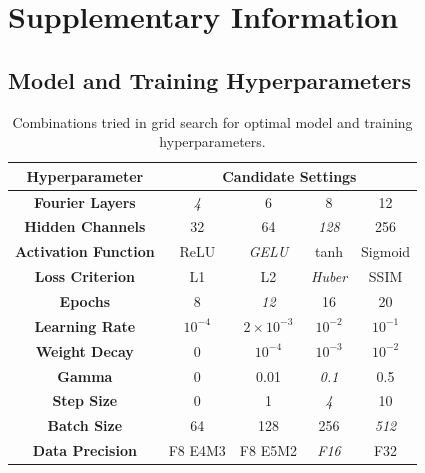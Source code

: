 \documentclass[preprint,review,12pt,numafflabel]{elsarticle}
\begin{document}

% 


\clearpage
\appendix

\renewcommand{\thesection}{S\arabic{section}}
\renewcommand{\thesubsection}{S\arabic{section}.\arabic{subsection}}
\renewcommand{\thefigure}{S\arabic{figure}}
\renewcommand{\thetable}{S\arabic{table}}
\renewcommand{\theequation}{S\arabic{equation}}

\setcounter{figure}{0}
\setcounter{table}{0}
\setcounter{equation}{0}

\section{Supplementary Information}
\label{sec:supplement}
\subsection{Model and Training Hyperparameters}
\begin{table}[H]
    \centering
    \begin{tabular}{|c|c|c|c|c|}
        \hline
        \textbf{Hyperparameter} &
        \multicolumn{4}{c|}{\textbf{Candidate Settings}} \\ \hline
    
        \textbf{Fourier Layers} & \textit{4} & 6 & 8 & 12 \\ \hline
        \textbf{Hidden Channels} & 32 & 64 & \textit{128} & 256 \\ \hline
        \textbf{Activation Function} & ReLU & \textit{GELU} & tanh & Sigmoid \\ \hline
        \textbf{Loss Criterion} & L1 & L2 & \textit{Huber} & SSIM \\ \hline
        \textbf{Epochs} & 8 & \textit{12} & 16 & 20 \\ \hline
        \textbf{Learning Rate} & $10^{-4}$ & \textit{$2\times10^{-3}$} & $10^{-2}$ & $10^{-1}$ \\ \hline
        \textbf{Weight Decay} & 0 & \textit{$10^{-4}$} & $10^{-3}$ & $10^{-2}$ \\ \hline
        \textbf{Gamma} & 0 & 0.01 & \textit{0.1} & 0.5 \\ \hline
        \textbf{Step Size} & 0 & 1 & \textit{4} & 10 \\ \hline
        \textbf{Batch Size} & 64 & 128 & 256 & \textit{512} \\ \hline
        \textbf{Data Precision} & F8 E4M3 & F8 E5M2 & \textit{F16} & F32 \\ \hline
    \end{tabular}
    \caption{Combinations tried in grid search for optimal model and training hyperparameters.}
    \label{tab:training_hyperparameters}
\end{table}
\end{document}
